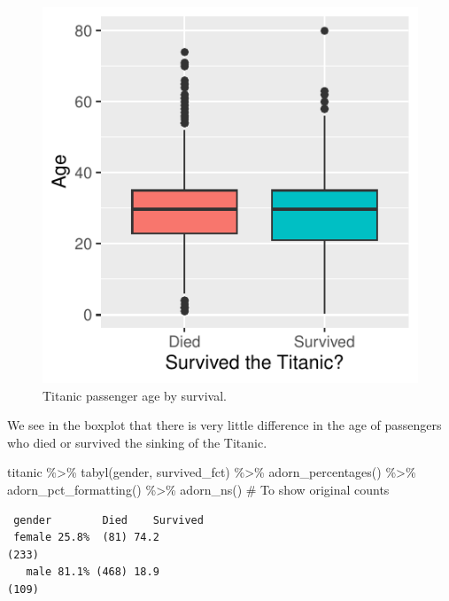 \documentclass[
  letterpaper,
  DIV=11,
  numbers=noendperiod]{scrartcl}
\newenvironment{Shaded}{\begin{snugshade}}{\end{snugshade}}
\newcommand{\CommentTok}[1]{\textcolor[rgb]{0.37,0.37,0.37}{#1}}
\newcommand{\FunctionTok}[1]{\textcolor[rgb]{0.28,0.35,0.67}{#1}}
\newcommand{\NormalTok}[1]{\textcolor[rgb]{0.00,0.23,0.31}{#1}}
\newcommand{\SpecialCharTok}[1]{\textcolor[rgb]{0.37,0.37,0.37}{#1}}
\begin{document}
\begin{tcolorbox}
\begin{figure}[H]

{\centering \includegraphics{about_files/figure-pdf/unnamed-chunk-10-1.pdf}

}

\caption{Titanic passenger age by survival.}

\end{figure}%

We see in the boxplot that there is very little difference in the age of
passengers who died or survived the sinking of the Titanic.

\begin{Shaded}
\begin{Highlighting}[]
\NormalTok{titanic }\SpecialCharTok{\%\textgreater{}\%}
  \FunctionTok{tabyl}\NormalTok{(gender, survived\_fct) }\SpecialCharTok{\%\textgreater{}\%}
  \FunctionTok{adorn\_percentages}\NormalTok{() }\SpecialCharTok{\%\textgreater{}\%}
  \FunctionTok{adorn\_pct\_formatting}\NormalTok{() }\SpecialCharTok{\%\textgreater{}\%}
  \FunctionTok{adorn\_ns}\NormalTok{() }\CommentTok{\# To show original counts}
\end{Highlighting}
\end{Shaded}

\begin{verbatim}
 gender        Died    Survived
 female 25.8%  (81) 74.2                                              (233)
   male 81.1% (468) 18.9                                              (109)
\end{verbatim}


\end{tcolorbox}
\end{document}
